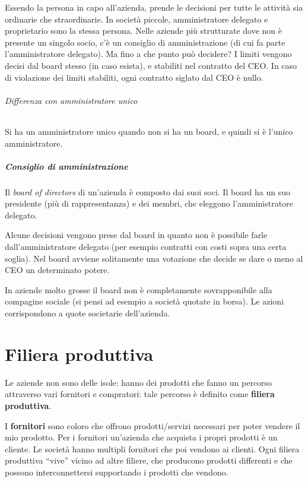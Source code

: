 Essendo la persona in capo all'azienda, prende le decisioni per tutte le
attività sia ordinarie che straordinarie. In società piccole,
amministratore delegato e proprietario sono la stessa persona. Nelle 
aziende più strutturate dove non è presente un singolo socio, c'è un
consiglio di amministrazione (di cui fa parte l'amministratore delegato).
Ma fino a che punto può decidere? I limiti vengono decisi dal board stesso (in
caso esista), e stabiliti nel contratto del CEO. In caso di violazione dei
limiti stabiliti, ogni contratto siglato dal CEO è nullo.

\subparagraph*{Differenza con amministratore unico} Si ha un amministratore
unico quando non si ha un board, e quindi si è l'unico amministratore.

\paragraph*{Consiglio di amministrazione} Il \textit{board of directors} di
un'azienda è composto dai suoi soci. Il board ha un suo presidente (più di
rappresentanza) e dei membri, che eleggono l'amministratore delegato.

Alcune decisioni vengono prese dal board in quanto non è possibile farle
dall'amministratore delegato (per esempio contratti con costi sopra una certa
soglia). Nel board avviene solitamente una votazione che decide se dare o meno
al CEO un determinato potere.

In aziende molto grosse il board non è completamente sovrapponibile alla
compagine sociale (si pensi ad esempio a società quotate in borsa). Le azioni
corrispondono a quote societarie dell'azienda.

\chapter{Filiera produttiva}


Le aziende non sono delle isole: hanno dei prodotti che fanno un percorso 
attraverso vari fornitori e compratori: tale percorso è definito come
\textbf{filiera produttiva}.

I \textbf{fornitori} sono coloro che offrono prodotti/servizi necessari per
poter vendere il mio prodotto. Per i fornitori un'azienda che acquista i propri
prodotti è un cliente. Le società hanno multipli fornitori che poi
vendono ai clienti.
Ogni filiera produttiva ``vive'' vicino ad altre filiere,
che producono prodotti differenti e che possono interconnettersi supportando i
prodotti che vendono.

